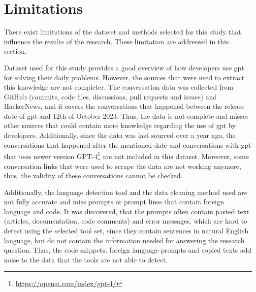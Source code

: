 \section{Limitations}
There exist limitations of the dataset and methods selected for this study that influence the results of the research. These limitation are addressed in this section. 

Dataset used for this study provides a good overview of how developers use \acrshort{gpt} for solving their daily problems. However, the sources that were used to extract this knowledge are not completer. The conversation data was collected from GitHub (commits, code files, discussions, pull requests and issues) and HackerNews, and it covers the conversations that happened between the release date of \acrshort{gpt} and 12th of October 2023. Thus, the data is not complete and misses other sources that could contain more knowledge regarding the use of \acrshort{gpt} by developers. Additionally, since the data was last sourced over a year ago, the conversations that happened after the mentioned date and conversations with \acrshort{gpt} that uses newer version GPT-4\footnote{\url{https://openai.com/index/gpt-4/}} are not included in this dataset. Moreover, some conversation links that were used to scrape the data are not working anymore, thus, the validity of these conversations cannot be checked.

Additionally, the language detection tool and the data cleaning method used are not fully accurate and miss prompts or prompt lines that contain foreign language and code. It was discovered, that the prompts often contain pasted text (articles, documentation, code comments) and error messages, which are hard to detect using the selected tool set, since they contain sentences in natural English language, but do not contain the information needed for answering the research question. Thus, the code snippets, foreign language prompts and copied texts add noise to the data that the tools are not able to detect.